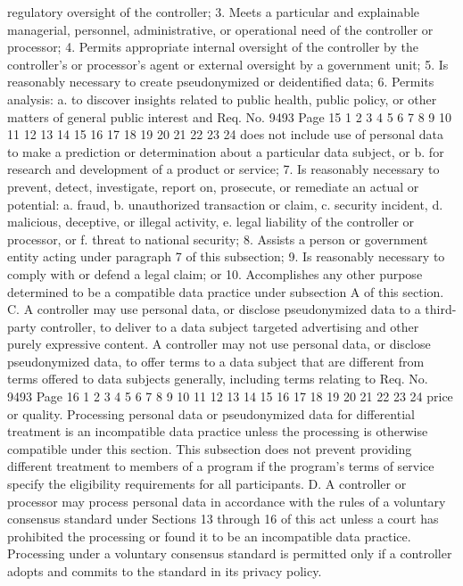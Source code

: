 regulatory oversight of the controller;
3. Meets a particular and explainable managerial, personnel,
administrative, or operational need of the controller or processor;
4. Permits appropriate internal oversight of the controller by the
controller's or processor's agent or external oversight by a government
unit;
5. Is reasonably necessary to create pseudonymized or deidentified data;
6. Permits analysis:
a. to discover insights related to public health, public
policy, or other matters of general public interest and 
Req. No. 9493 Page 15
1
2
3
4
5
6
7
8
9
10
11
12
13
14
15
16
17
18
19
20
21
22
23
24
does not include use of personal data to make a
prediction or determination about a particular data
subject, or
b. for research and development of a product or service;
7. Is reasonably necessary to prevent, detect, investigate,
report on, prosecute, or remediate an actual or potential:
a. fraud,
b. unauthorized transaction or claim,
c. security incident,
d. malicious, deceptive, or illegal activity,
e. legal liability of the controller or processor, or
f. threat to national security;
8. Assists a person or government entity acting under paragraph
7 of this subsection;
9. Is reasonably necessary to comply with or defend a legal
claim; or
10. Accomplishes any other purpose determined to be a
compatible data practice under subsection A of this section.
C. A controller may use personal data, or disclose
pseudonymized data to a third-party controller, to deliver to a data
subject targeted advertising and other purely expressive content. A
controller may not use personal data, or disclose pseudonymized
data, to offer terms to a data subject that are different from terms
offered to data subjects generally, including terms relating to 
Req. No. 9493 Page 16
1
2
3
4
5
6
7
8
9
10
11
12
13
14
15
16
17
18
19
20
21
22
23
24
price or quality. Processing personal data or pseudonymized data
for differential treatment is an incompatible data practice unless
the processing is otherwise compatible under this section. This
subsection does not prevent providing different treatment to members
of a program if the program's terms of service specify the
eligibility requirements for all participants.
D. A controller or processor may process personal data in
accordance with the rules of a voluntary consensus standard under
Sections 13 through 16 of this act unless a court has prohibited the
processing or found it to be an incompatible data practice.
Processing under a voluntary consensus standard is permitted only if
a controller adopts and commits to the standard in its privacy
policy.

